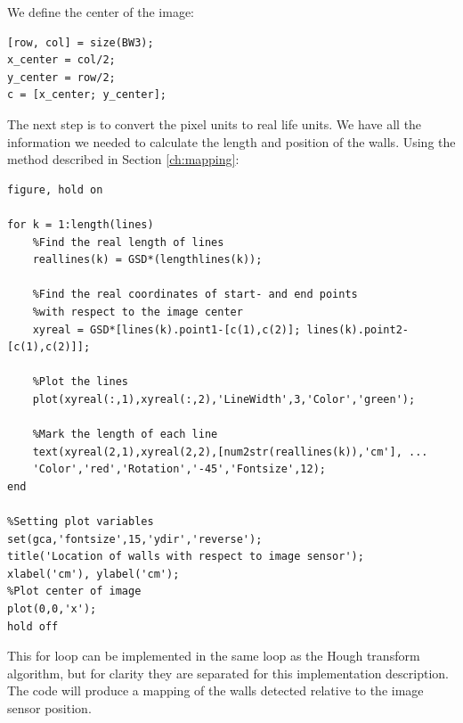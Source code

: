 We define the center of the image:
\begin{lstlisting}[firstnumber=65]
%Define the center of the image
[row, col] = size(BW3);
x_center = col/2;
y_center = row/2;
c = [x_center; y_center];
\end{lstlisting}
The next step is to convert the pixel units to real life units. We have all the information we needed to calculate the length and position of the walls. Using the method described in Section \ref{ch:mapping}:
\begin{lstlisting}[firstnumber = 70]
figure, hold on

for k = 1:length(lines)
    %Find the real length of lines
    reallines(k) = GSD*(lengthlines(k));
    
    %Find the real coordinates of start- and end points
    %with respect to the image center
    xyreal = GSD*[lines(k).point1-[c(1),c(2)]; lines(k).point2-[c(1),c(2)]];
    
    %Plot the lines
    plot(xyreal(:,1),xyreal(:,2),'LineWidth',3,'Color','green');
    
    %Mark the length of each line 
    text(xyreal(2,1),xyreal(2,2),[num2str(reallines(k)),'cm'], ...
    'Color','red','Rotation','-45','Fontsize',12);   
end

%Setting plot variables 
set(gca,'fontsize',15,'ydir','reverse');
title('Location of walls with respect to image sensor');
xlabel('cm'), ylabel('cm');
%Plot center of image
plot(0,0,'x');
hold off
\end{lstlisting}
This for loop can be implemented in the same loop as the Hough transform algorithm, but for clarity they are separated for this implementation description. The code will produce a mapping of the walls detected relative to the image sensor position.

